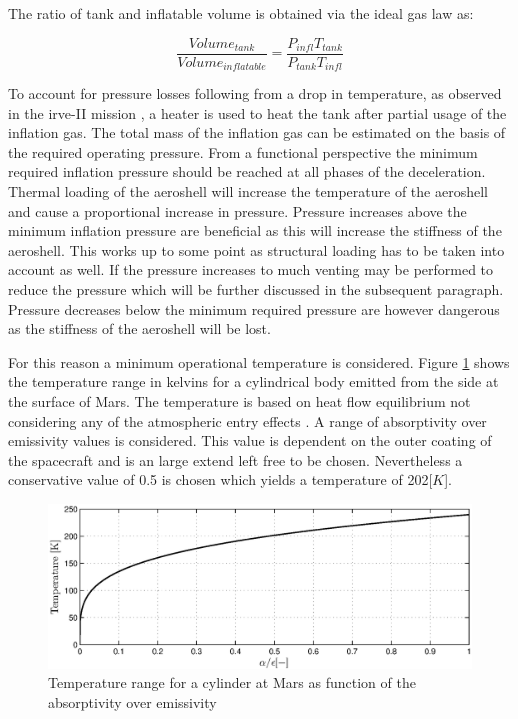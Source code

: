 The ratio of tank and inflatable volume is obtained via the ideal gas law as:

\begin{equation}
\frac{Volume_{tank}}{Volume_{inflatable}} = \frac{P_{infl}T_{tank}}{P_{tank}T_{infl}}
\label{eq:volratio}
\end{equation}

To account for pressure losses following from a drop in temperature, as observed in the \gls{irve}-II mission \cite{Dillman2012}, a heater is used to heat the tank after partial usage of the inflation gas. The total mass of the inflation gas can be estimated on the basis of the required operating pressure. From a functional perspective the minimum required inflation pressure should be reached at all phases of the deceleration. Thermal loading of the aeroshell will increase the temperature of the aeroshell and cause a proportional increase in pressure. Pressure increases above the minimum inflation pressure are beneficial as this will increase the stiffness of the aeroshell. This works up to some point as structural loading has to be taken into account as well. If the pressure increases to much venting may be performed to reduce the pressure which will be further discussed in the subsequent paragraph. Pressure decreases below the minimum required pressure are however dangerous as the stiffness of the aeroshell will be lost.

For this reason a minimum operational temperature is considered. Figure \ref{fig:tanktemp} shows the temperature range in kelvins for a cylindrical body emitted from the side at the surface of Mars. The temperature is based on heat flow equilibrium not considering any of the atmospheric entry effects \cite{Wertz2011}. A range of absorptivity over emissivity values is considered. This value is dependent on the outer coating of the spacecraft and is an large extend left free to be chosen. Nevertheless a conservative value of 0.5 is chosen which yields a temperature of 202[$K$].

\begin{figure}[h]
		\centering
		\includegraphics[width=1.0\textwidth]{./Figure/Structure/tanktemperature.eps}
		\caption{Temperature range for a cylinder at Mars as function of the absorptivity over emissivity}
		\label{fig:tanktemp}
\end{figure}

